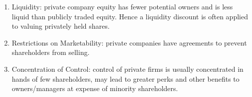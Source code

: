 \begin{remark} 
\begin{enumerate}[label=\roman*.]
\setlength{\itemsep}{0pt}
\item Liquidity: private company equity has fewer potential owners and is less liquid than publicly traded equity. Hence a liquidity discount is often applied to valuing privately held shares.
\item Restrictions on Marketability: private companies have agreements to prevent shareholders from selling.
\item Concentration of Control: control of private firms is usually concentrated in hands of few shareholders, may lead to greater perks and other benefits to owners/managers at expense of minority shareholders.
\end{enumerate}
\end{remark}